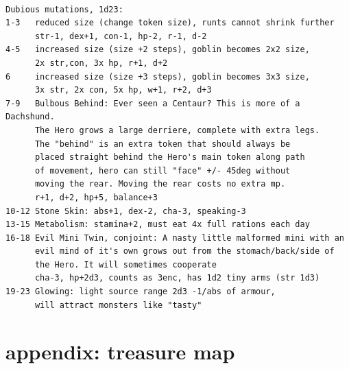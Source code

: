 \

\goodbreak \small \begin{samepage} \begin{verbatim}
Dubious mutations, 1d23:
1-3   reduced size (change token size), runts cannot shrink further
      str-1, dex+1, con-1, hp-2, r-1, d-2
4-5   increased size (size +2 steps), goblin becomes 2x2 size,
      2x str,con, 3x hp, r+1, d+2
6     increased size (size +3 steps), goblin becomes 3x3 size,
      3x str, 2x con, 5x hp, w+1, r+2, d+3
7-9   Bulbous Behind: Ever seen a Centaur? This is more of a Dachshund.
      The Hero grows a large derriere, complete with extra legs.
      The "behind" is an extra token that should always be
      placed straight behind the Hero's main token along path
      of movement, hero can still "face" +/- 45deg without
      moving the rear. Moving the rear costs no extra mp.
      r+1, d+2, hp+5, balance+3
10-12 Stone Skin: abs+1, dex-2, cha-3, speaking-3
13-15 Metabolism: stamina+2, must eat 4x full rations each day
16-18 Evil Mini Twin, conjoint: A nasty little malformed mini with an
      evil mind of it's own grows out from the stomach/back/side of
      the Hero. It will sometimes cooperate
      cha-3, hp+2d3, counts as 3enc, has 1d2 tiny arms (str 1d3)
19-23 Glowing: light source range 2d3 -1/abs of armour,
      will attract monsters like "tasty"
\end{verbatim} \end{samepage} \normalsize






























\clearpage
\raggedbottom
\section*{appendix: treasure map}
\label{appendixtreasuremap}



